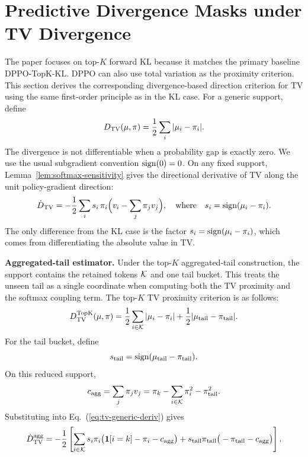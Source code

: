\section{Predictive Divergence Masks under TV Divergence}
\label{app:topk-tv-predictive}

The paper focuses on top-$K$ forward KL because it matches the primary baseline
DPPO-TopK-KL.
DPPO can also use total variation as the proximity criterion.
This section derives the corresponding divergence-based direction criterion for TV using the same
first-order principle as in the KL case.
For a generic support, define
\begin{equation}
D_{\mathrm{TV}}(\mu,\pi)
=
\frac12\sum_i|\mu_i-\pi_i|.
\end{equation}
The divergence is not differentiable when a probability gap is exactly zero.
We use the usual subgradient convention $\operatorname{sign}(0)=0$.
On any fixed support, Lemma~\ref{lem:softmax-sensitivity} gives the
directional derivative of TV along the unit policy-gradient direction:
\begin{equation}
\label{eq:tv-generic-deriv}
\dot{D}_{\mathrm{TV}}
=
-\frac12\sum_i s_i\,\pi_i\Big(v_i-\sum_j\pi_jv_j\Big),
\quad\text{where}\quad
s_i=\operatorname{sign}(\mu_i-\pi_i).
\end{equation}
The only difference from the KL case is the factor
$s_i=\operatorname{sign}(\mu_i-\pi_i)$, which comes from differentiating the absolute value
in TV.

\noindent\textbf{Aggregated-tail estimator.}
Under the top-$K$ aggregated-tail construction, the support contains the retained
tokens $\mathcal{K}$ and one tail bucket.
This treats the unseen tail as a single coordinate when computing both the TV
proximity and the softmax coupling term.
The top-$K$ TV proximity criterion is as follows:
\begin{equation}
D_{\mathrm{TV}}^{\mathrm{TopK}}(\mu,\pi)
=
\frac12\sum_{i\in\mathcal{K}}|\mu_i-\pi_i|
+
\frac12|\mu_{\mathrm{tail}}-\pi_{\mathrm{tail}}|.
\end{equation}
For the tail bucket, define
\begin{equation}
 s_{\mathrm{tail}}
 =\operatorname{sign}(\mu_{\mathrm{tail}}-\pi_{\mathrm{tail}}).
\end{equation}
On this reduced support,
\begin{equation}
 c_{\mathrm{agg}}
 =\sum_j\pi_jv_j
 =\pi_k-
 \sum_{i\in\mathcal{K}}\pi_i^2
 -\pi_{\mathrm{tail}}^2 .
\end{equation}
Substituting into Eq.~(\ref{eq:tv-generic-deriv}) gives
\begin{equation}
\label{eq:tv-agg-tail}
\dot{D}_{\mathrm{TV}}^{\mathrm{agg}}
=
-\frac12
\left[
\sum_{i\in\mathcal{K}}
 s_i\pi_i\big(\bm{1}[i=k]-\pi_i-c_{\mathrm{agg}}\big)
+
 s_{\mathrm{tail}}\pi_{\mathrm{tail}}
 \big(-\pi_{\mathrm{tail}}-c_{\mathrm{agg}}\big)
\right].
\end{equation}

